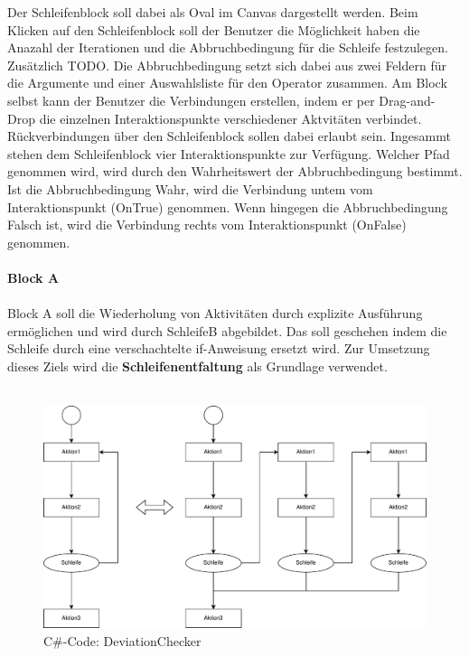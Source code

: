     Der Schleifenblock soll dabei als Oval im Canvas dargestellt werden.
    Beim Klicken auf den Schleifenblock soll der Benutzer die Möglichkeit haben die Anazahl der Iterationen und die Abbruchbedingung für die Schleife festzulegen.
    Zusätzlich TODO.
    Die Abbruchbedingung setzt sich dabei aus zwei Feldern für die Argumente und einer Auswahlsliste für den Operator zusammen.
    Am Block selbst kann der Benutzer die Verbindungen erstellen, indem er per Drag-and-Drop die einzelnen Interaktionspunkte verschiedener Aktvitäten verbindet.
    Rückverbindungen über den Schleifenblock sollen dabei erlaubt sein.
    Ingesammt stehen dem Schleifenblock vier Interaktionspunkte zur Verfügung.
    Welcher Pfad genommen wird, wird durch den Wahrheitswert der Abbruchbedingung bestimmt.
    Ist die Abbruchbedingung Wahr, wird die Verbindung untem vom Interaktionspunkt (OnTrue) genommen.
    Wenn hingegen die Abbruchbedingung Falsch ist, wird die Verbindung rechts vom Interaktionspunkt (OnFalse) genommen.\\
    \\
    \textbf{Block A}\\
    \\
    Block A soll die Wiederholung von Aktivitäten durch explizite Ausführung ermöglichen und wird durch SchleifeB abgebildet.
    Das soll geschehen indem die Schleife durch eine verschachtelte if-Anweisung ersetzt wird.
    Zur Umsetzung dieses Ziels wird die \textbf{Schleifenentfaltung} als Grundlage verwendet.\\
    \\
    \begin{figure}[H]
        \centering
        \includegraphics[width=\textwidth]{./images/loop-unrolling.pdf}       
        \caption{C\#-Code: DeviationChecker}
    \end{figure}
